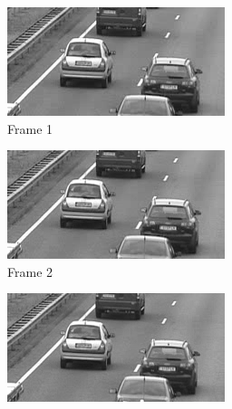 \documentclass[a4paper, landscape]{article}
\begin{document}
\begin{figure}[H]
	\begin{subfigure}{0.13\linewidth}
		\centering
		\includegraphics[width=\linewidth]{cars/frame = 1.png}
		\caption{Frame 1}
	\end{subfigure}
	\begin{subfigure}{0.13\linewidth}
		\centering
		\includegraphics[width=\linewidth]{cars/frame = 2.png}
		\caption{Frame 2}
	\end{subfigure}
	\begin{subfigure}{0.13\linewidth}
		\centering
		\includegraphics[width=\linewidth]{cars/frame = 3.png}

\end{subfigure}
\end{figure}
\end{document}
